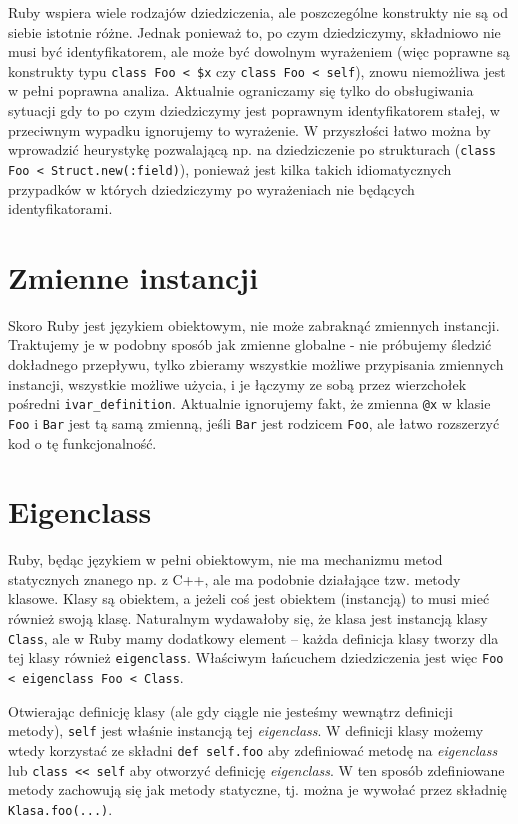 \documentclass[declaration,shortabstract,mgr]{iithesis}
\begin{document}
Ruby wspiera wiele rodzajów dziedziczenia, ale poszczególne konstrukty nie są od siebie istotnie różne. Jednak ponieważ to, po czym dziedziczymy, składniowo nie musi być identyfikatorem, ale może być dowolnym wyrażeniem (więc poprawne są konstrukty typu \texttt{class Foo < \$x} czy \texttt{class Foo < self}), znowu niemożliwa jest w pełni poprawna analiza. Aktualnie ograniczamy się tylko do obsługiwania sytuacji gdy to po czym dziedziczymy jest poprawnym identyfikatorem stałej, w przeciwnym wypadku ignorujemy to wyrażenie. W przyszłości łatwo można by wprowadzić heurystykę pozwalającą np. na dziedziczenie po strukturach (\texttt{class Foo < Struct.new(:field)}), ponieważ jest kilka takich idiomatycznych przypadków w których dziedziczymy po wyrażeniach nie będących identyfikatorami.

\section{Zmienne instancji}

Skoro Ruby jest językiem obiektowym, nie może zabraknąć zmiennych instancji. Traktujemy je w podobny sposób jak zmienne globalne - nie próbujemy śledzić dokładnego przepływu, tylko zbieramy wszystkie możliwe przypisania zmiennych instancji, wszystkie możliwe użycia, i je łączymy ze sobą przez wierzchołek pośredni \texttt{ivar\_definition}. Aktualnie ignorujemy fakt, że zmienna \texttt{@x} w klasie \texttt{Foo} i \texttt{Bar} jest tą samą zmienną, jeśli \texttt{Bar} jest rodzicem \texttt{Foo}, ale łatwo rozszerzyć kod o tę funkcjonalność.

\section{Eigenclass}

Ruby, będąc językiem w pełni obiektowym, nie ma mechanizmu metod statycznych znanego np. z C++, ale ma podobnie działające tzw. metody klasowe. Klasy są obiektem, a jeżeli coś jest obiektem (instancją) to musi mieć również swoją klasę. Naturalnym wydawałoby się, że klasa jest instancją klasy \texttt{Class}, ale w Ruby mamy dodatkowy element -- każda definicja klasy tworzy dla tej klasy również \texttt{eigenclass}. Właściwym łańcuchem dziedziczenia jest więc \texttt{Foo < eigenclass Foo < Class}.

Otwierając definicję klasy (ale gdy ciągle nie jesteśmy wewnątrz definicji metody), \texttt{self} jest właśnie instancją tej \textit{eigenclass}. W definicji klasy możemy wtedy korzystać ze składni \texttt{def self.foo} aby zdefiniować metodę na \textit{eigenclass} lub \texttt{class << self} aby otworzyć definicję \textit{eigenclass}. W ten sposób zdefiniowane metody zachowują się jak metody statyczne, tj. można je wywołać przez składnię \texttt{Klasa.foo(...)}.
\end{document}

